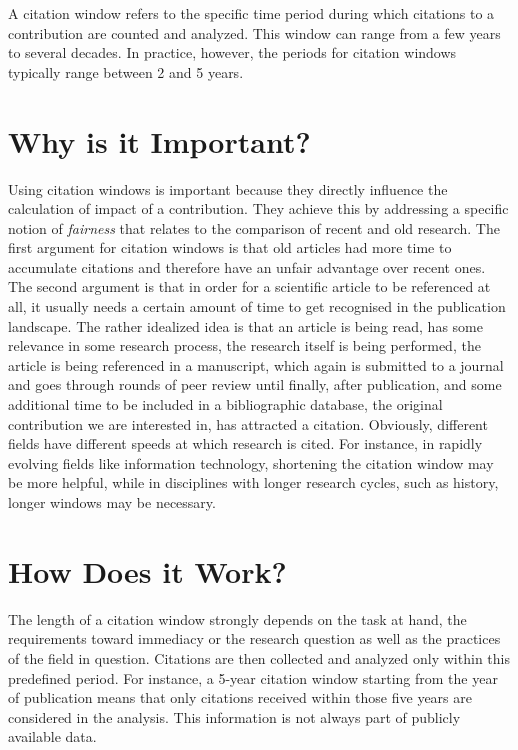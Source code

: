 \documentclass[
  letterpaper,
]{scrreprt}
\begin{document}
A citation window refers to the specific time period during which
citations to a contribution are counted and analyzed. This window can
range from a few years to several decades. In practice, however, the
periods for citation windows typically range between 2 and 5 years.

\section{Why is it Important?}\label{why-is-it-important}

Using citation windows is important because they directly influence the
calculation of impact of a contribution. They achieve this by addressing
a specific notion of \emph{fairness} that relates to the comparison of
recent and old research. The first argument for citation windows is that
old articles had more time to accumulate citations and therefore have an
unfair advantage over recent ones. The second argument is that in order
for a scientific article to be referenced at all, it usually needs a
certain amount of time to get recognised in the publication landscape.
The rather idealized idea is that an article is being read, has some
relevance in some research process, the research itself is being
performed, the article is being referenced in a manuscript, which again
is submitted to a journal and goes through rounds of peer review until
finally, after publication, and some additional time to be included in a
bibliographic database, the original contribution we are interested in,
has attracted a citation. Obviously, different fields have different
speeds at which research is cited. For instance, in rapidly evolving
fields like information technology, shortening the citation window may
be more helpful, while in disciplines with longer research cycles, such
as history, longer windows may be necessary.

\section{How Does it Work?}\label{how-does-it-work}

The length of a citation window strongly depends on the task at hand,
the requirements toward immediacy or the research question as well as
the practices of the field in question. Citations are then collected and
analyzed only within this predefined period. For instance, a 5-year
citation window starting from the year of publication means that only
citations received within those five years are considered in the
analysis. This information is not always part of publicly available
data.
\end{document}

